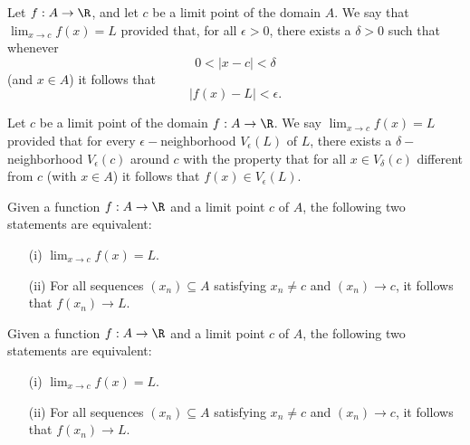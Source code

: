 \begin{tcolorbox}
    \begin{defn}
        Let \( f: A \to \R  \), and let \( c \) be a limit point of the domain \( A  \). We say that \( \lim_{ x \to c } f(x) = L   \) provided that, for all \( \epsilon > 0  \), there exists a \( \delta > 0  \) such that whenever 
        \[ 0 <  | x - c  | < \delta  \] (and \( x \in A  \)) it follows that 
        \[ | f(x) - L  | < \epsilon.  \]
    \end{defn}
\end{tcolorbox}

\begin{tcolorbox}
\begin{defn}
    Let \( c  \) be a limit point of the domain \( f: A \to \R  \). We say \( \lim_{ x \to c } f(x) = L  \) provided that for every \( \epsilon - \)neighborhood \( V_{\epsilon }(L)  \) of \( L \), there exists a \( \delta- \)neighborhood \( V_{\epsilon }(c) \) around \( c \) with the property that for all \( x \in V_{\delta}(c) \) different from \( c  \) (with \( x \in A  \)) it follows that \( f(x) \in V_{\epsilon }(L) \).
\end{defn}
\end{tcolorbox}


\begin{tcolorbox}
    \begin{thm}
    Given a function \( f: A \to \R  \) and a limit point \( c \) of \( A \), the following two statements are equivalent: 
    \begin{enumerate}
        \item[(i)] \( \lim_{ x \to c } f(x) = L. \)
        \item[(ii)] For all sequences \( (x_n) \subseteq A  \) satisfying \( x_n \neq c  \) and \( (x_n) \to c  \), it follows that \( f(x_n) \to L  \).
    \end{enumerate}
    \end{thm}
\end{tcolorbox}


\begin{tcolorbox}
    \begin{thm}
    Given a function \( f: A \to \R  \) and a limit point \( c \) of \( A \), the following two statements are equivalent: 
    \begin{enumerate}
        \item[(i)] \( \lim_{ x \to c } f(x) = L. \)
        \item[(ii)] For all sequences \( (x_n) \subseteq A  \) satisfying \( x_n \neq c  \) and \( (x_n) \to c  \), it follows that \( f(x_n) \to L  \).
    \end{enumerate}
    \end{thm}
\end{tcolorbox}


